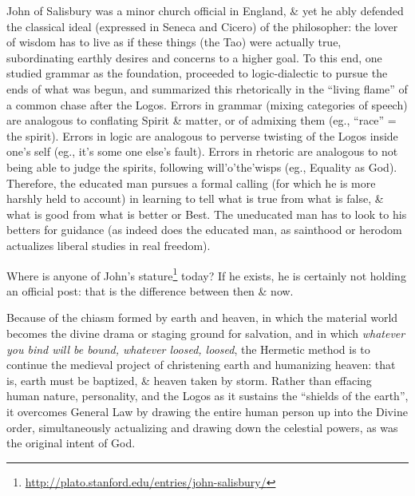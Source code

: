 John of Salisbury was a minor church official in England, \& yet he ably defended the classical ideal (expressed in Seneca and Cicero) of the philosopher: the lover of wisdom has to live as if these things (the Tao) were actually true, subordinating earthly desires and concerns to a higher goal. To this end, one studied grammar as the foundation, proceeded to logic-dialectic to pursue the ends of what was begun, and summarized this rhetorically in the ``living flame'' of a common chase after the Logos. Errors in grammar (mixing categories of speech) are analogous to conflating Spirit \& matter, or of admixing them (eg., ``race'' = the spirit). Errors in logic are analogous to perverse twisting of the Logos inside one's self (eg., it's some one else's fault). Errors in rhetoric are analogous to not being able to judge the spirits, following will'o'the'wisps (eg., Equality as God). Therefore, the educated man pursues a formal calling (for which he is more harshly held to account) in learning to tell what is true from what is false, \& what is good from what is better or Best. The uneducated man has to look to his betters for guidance (as indeed does the educated man, as sainthood or herodom actualizes liberal studies in real freedom).

Where is anyone of John's stature\footnote{\url{http://plato.stanford.edu/entries/john-salisbury/}} today? If he exists, he is certainly not holding an official post: that is the difference between then \& now.

Because of the chiasm formed by earth and heaven, in which the material world becomes the divine drama or staging ground for salvation, and in which \emph{whatever you bind will be bound, whatever loosed, loosed}, the Hermetic method is to continue the medieval project of christening earth and humanizing heaven: that is, earth must be baptized, \& heaven taken by storm. Rather than effacing human nature, personality, and the Logos as it sustains the ``shields of the earth'', it overcomes General Law by drawing the entire human person up into the Divine order, simultaneously actualizing and drawing down the celestial powers, as was the original intent of God.

